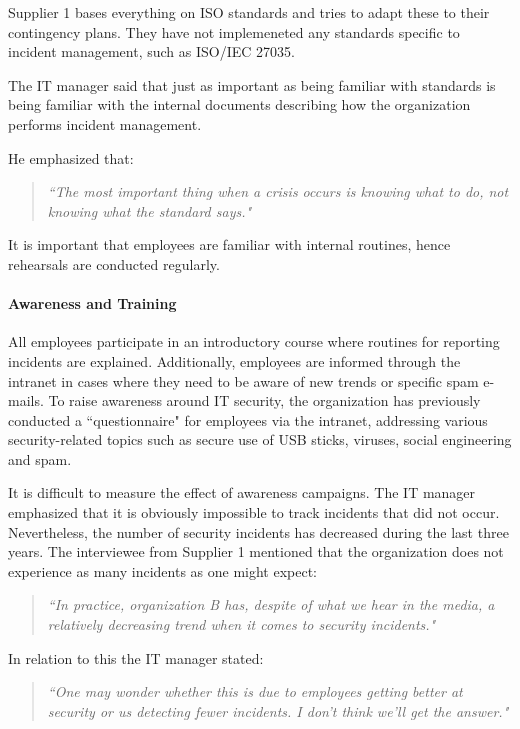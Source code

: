 \documentclass[b5paper, twoside, openright, 11pt]{report}
\begin{document}
Supplier 1 bases everything on \acs{ISO} standards and tries to adapt these to their contingency plans. They have not implemeneted any standards specific to incident management, such as \acs{ISO}/\acs{IEC} 27035. 

The IT manager said that just as important as being familiar with standards is being familiar with the internal documents describing how the organization performs incident management. 

He emphasized that:
\begin{quote}
\textit{``The most important thing when a crisis occurs is knowing what to do, not knowing what the standard says."}
\end{quote}
It is important that employees are familiar with internal routines, hence rehearsals are conducted regularly.

\paragraph{Awareness and Training}
All employees participate in an introductory course where routines for reporting incidents are explained. Additionally, employees are informed through the intranet in cases where they need to be aware of new trends or specific spam e-mails. To raise awareness around IT security, the organization has previously conducted a ``questionnaire" for employees via the intranet, addressing various security-related topics such as secure use of USB sticks, viruses, social engineering and spam. 

It is difficult to measure the effect of awareness campaigns. The IT manager emphasized that it is obviously impossible to track incidents that did not occur. Nevertheless, the number of security incidents has decreased during the last three years. The interviewee from Supplier 1 mentioned that the organization does not experience as many incidents as one might expect: 

\begin{quote}
\textit{``In practice, organization B has, despite of what we hear in the media, a relatively decreasing trend when it comes to security incidents."}
\end{quote} 

In relation to this the IT manager stated:

\begin{quote}
\textit{``One may wonder whether this is due to employees getting better at security or us detecting fewer incidents. I don't think we'll get the answer."}
\end{quote}
 
\end{document}
